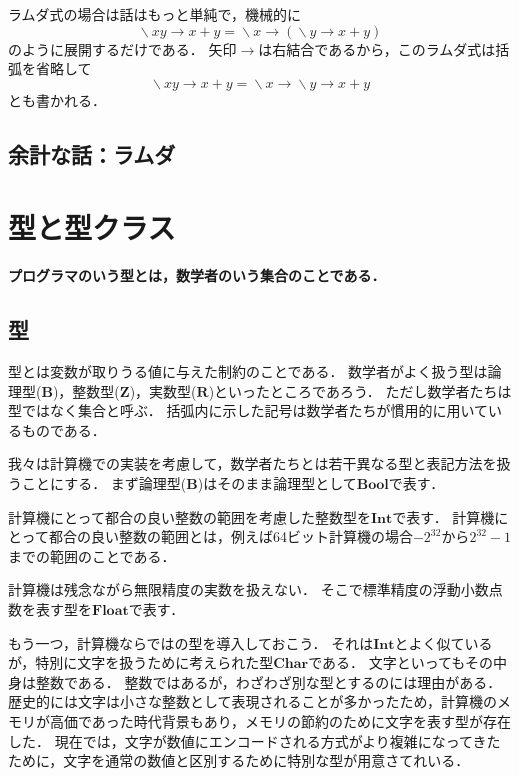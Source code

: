 \documentclass[twocolumn]{jsbook}
\newcommand{\hsklType}[1]{\textbf{#1}}
\newcommand{\hsklBool}{\hsklType{Bool}}
\newcommand{\hsklChar}{\hsklType{Char}}
\newcommand{\hsklInt}{\hsklType{Int}}
\newcommand{\hsklFloat}{\hsklType{Float}}
\DeclareMathOperator{\mathLambda}{\backslash}
\newcommand{\mathLambdaArrow}{\rightarrow}
\newcommand{\mathSet}[1]{\mathbf{#1}}
\newcommand{\mathLambdaExpression}[2]{\mathLambda#1\mathLambdaArrow#2}
\newenvironment{leader}{\begingroup\bf}{\endgroup}
\begin{document}
ラムダ式の場合は話はもっと単純で，機械的に$$\mathLambdaExpression{xy}{x+y}=\mathLambdaExpression{x}{(\mathLambdaExpression{y}{x+y})}$$のように展開するだけである．
矢印$\mathLambdaArrow$は右結合であるから，このラムダ式は括弧を省略して$$\mathLambdaExpression{xy}{x+y}=\mathLambdaExpression{x}{\mathLambdaExpression{y}{x+y}}$$とも書かれる．


\section*{余計な話：ラムダ}


\chapter{型と型クラス}

\begin{leader}
プログラマのいう型とは，数学者のいう集合のことである．
\end{leader}


\section{型}

型とは変数が取りうる値に与えた制約のことである．
数学者がよく扱う型は論理型($\mathSet{B}$)，整数型($\mathSet{Z}$)，実数型($\mathSet{R}$)といったところであろう．
ただし数学者たちは型ではなく集合と呼ぶ．
括弧内に示した記号は数学者たちが慣用的に用いているものである．

我々は計算機での実装を考慮して，数学者たちとは若干異なる型と表記方法を扱うことにする．
まず論理型($\mathSet{B}$)はそのまま論理型として$\hsklBool$で表す．

計算機にとって都合の良い整数の範囲を考慮した整数型を$\hsklInt$で表す．
計算機にとって都合の良い整数の範囲とは，例えば64ビット計算機の場合$-2^{32}$から$2^{32}-1$までの範囲のことである．

計算機は残念ながら無限精度の実数を扱えない．
そこで標準精度の浮動小数点数を表す型を$\hsklFloat$で表す．

もう一つ，計算機ならではの型を導入しておこう．
それは$\hsklInt$とよく似ているが，特別に文字を扱うために考えられた型$\hsklChar$である．
文字といってもその中身は整数である．
整数ではあるが，わざわざ別な型とするのには理由がある．
歴史的には文字は小さな整数として表現されることが多かったため，計算機のメモリが高価であった時代背景もあり，メモリの節約のために文字を表す型が存在した．
現在では，文字が数値にエンコードされる方式がより複雑になってきたために，文字を通常の数値と区別するために特別な型が用意さてれいる．
\end{document}
